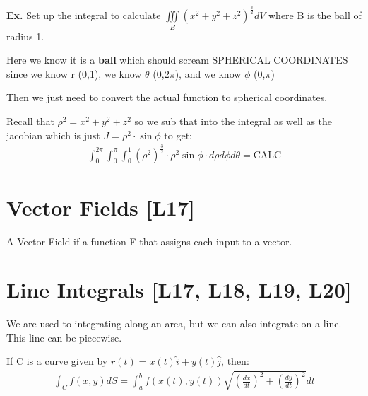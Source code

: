 \documentclass[12pt,letterpaper]{article} \usepackage{amsmath} \usepackage{graphicx} \usepackage[margin=1in]{geometry} \usepackage{longtable}  \usepackage{amssymb}
\begin{document}
	\begin{mdframed}[]
		\textbf{Ex. } Set up the integral to calculate $\iiint \limits_B \left(x^2+y^2+z^2\right)^{\frac{3}{2}} dV$ where B is the ball of radius 1.
		
		Here we know it is a \textbf{ball} which should scream SPHERICAL COORDINATES since we know r (0,1), we know $\theta$ (0,$2\pi$), and we know $\phi$ (0,$\pi$)
		
		Then we just need to convert the actual function to spherical coordinates. 
		
		Recall that $\rho^2 = x^2 + y^2 + z^2$ so we sub that into the integral as well as the jacobian which is just $J=\rho ^2 \cdot \sin\phi$ to get:
		\begin{align*}
			\int_0^{2\pi}\int_0^{\pi}\int_0^1\left(\rho^2\right)^{\frac{3}{2}} \cdot \rho^2\sin\phi \cdot d\rho d\phi d\theta = \text{CALC}
		\end{align*}
	\end{mdframed}

	\section{Vector Fields [L17]}
	A Vector Field if a function F that assigns each input to a vector. 
	
	\section{Line Integrals [L17, L18, L19, L20]}
	We are used to integrating along an area, but we can also integrate on a line. This line can be piecewise. 
	
	If C is a curve given by $r(t) = x(t) \hat{i} + y(t) \hat{j}$, then:
	\begin{align*}
		\int_C f(x,y) dS = \int_a^b f(x(t),y(t)) \sqrt{\left(\frac{dx}{dt}\right)^2 + \left(\frac{dy}{dt}\right)^2}dt
	\end{align*}
\end{document}
